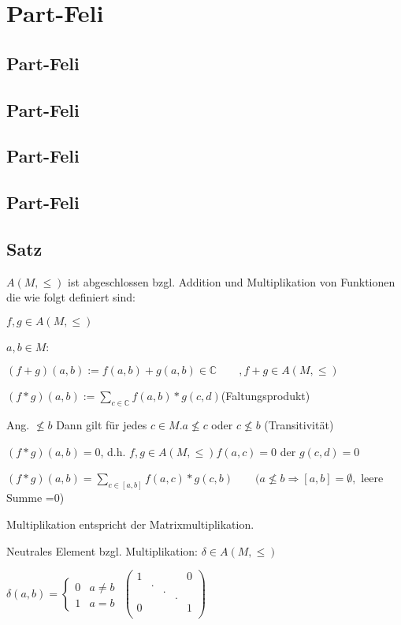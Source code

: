 \section{Part-Feli}
\subsection{Part-Feli}
\subsection{Part-Feli}
\subsection{Part-Feli}
\subsection{Part-Feli}
\subsection{Satz}
$A(M,\leq)$ ist abgeschlossen bzgl. Addition und Multiplikation von Funktionen die wie folgt definiert sind:

$ f,g\in A(M,\leq)$

$a,b \in M$:

$(f+g)(a,b):= f(a,b)+g(a,b) \in \mathbb{C} \qquad ,f+g \in A(M,\leq)$
	
$(f*g)(a,b):= \sum_{c\in \mathbb{C}}f(a,b)*g(c,d) $\qquad (Faltungsprodukt)
	 
Ang. $ \nleq b$ Dann gilt für jedes $c \in M. a \nleq c$ oder $c\nleq b$ (Transitivität)
	 
$(f*g)(a,b)=0$, d.h. $f,g\in A(M,\leq)f(a,c)=0 $ der $g(c,d)=0$
	 
$(f*g)(a,b) = \sum_{c\in [a,b]}f(a,c)*g(c,b) \qquad(a \nleq b \Rightarrow [a,b] = \emptyset,$ leere Summe =0)

Multiplikation entspricht der Matrixmultiplikation.

Neutrales Element bzgl. Multiplikation: $\delta \in A(M,\leq)$

$\delta(a,b)=\begin{cases}
0 & a\neq b\\
1 & a=b
\end{cases}$ \qquad $\begin{pmatrix}
	1 & & & & 0\\
	  &. & & & \\
	  & &. & & \\
	  & & &. & \\
	0 & & & &1 \\
\end{pmatrix}
$
